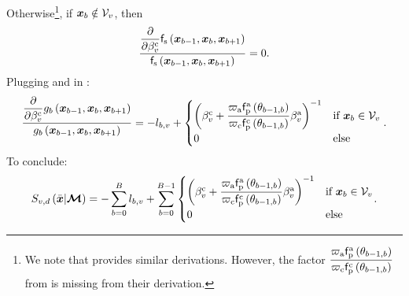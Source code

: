 \documentclass{article}
\begin{document}
Otherwise\footnote{We note that \citep{loeub2020monotonicity} provides similar derivations. However, the factor $\dfrac{\varpi_{\text{a}}\mathsf{f}_{\text{p}}^{\text{a}}\left({\theta_{b-1,b}}\right)}{\varpi_{\text{c}}\mathsf{f}_{\text{p}}^{\text{c}}\left({\theta_{b-1,b}}\right)}$ from \eq{\ref{eq:fs_deriv}} is missing from their derivation.}, if $\boldsymbol{x}_{b}\notin\mathcal{V}_{v}$, then
\begin{equation}
\label{eq:fs_deriv0}
    \frac{\dfrac{\partial}{\partial {\beta^{\text{c}}_v}}\mathsf{f}_{\text{s}}\left({\boldsymbol{x}_{b-1},\boldsymbol{x}_{b},\boldsymbol{x}_{b+1}}\right)}{\mathsf{f}_{\text{s}}\left({\boldsymbol{x}_{b-1},\boldsymbol{x}_{b},\boldsymbol{x}_{b+1}}\right)}=0.
\end{equation}
Plugging \eq{\ref{eq:trans_deriv_b}} and \eqs{\ref{eq:fs_deriv},\ref{eq:fs_deriv0}} in \eq{\ref{eq:gb_deriv}}:
\begin{equation}
\frac{\dfrac{\partial}{\partial {\beta^{\text{c}}_v}}g_{b}\left({\boldsymbol{x}_{b-1},\boldsymbol{x}_{b},\boldsymbol{x}_{b+1}}\right)}{g_{b}\left({\boldsymbol{x}_{b-1},\boldsymbol{x}_{b},\boldsymbol{x}_{b+1}}\right)} = -l_{b, v}
+
\begin{cases}
\left({\beta^{\text{c}}_{v}+\dfrac{\varpi_{\text{a}}\mathsf{f}_{\text{p}}^{\text{a}}\left({\theta_{b-1,b}}\right)}{\varpi_{\text{c}}\mathsf{f}_{\text{p}}^{\text{c}}\left({\theta_{b-1,b}}\right)}\beta^{\text{a}}_{v}}\right) ^ {-1} & \text{if $\boldsymbol{x}_{b}\in\mathcal{V}_{v}$} \\
0 & \text{else}
\end{cases}.
\end{equation}
To conclude:
\begin{equation}
S_{v, d}\left({\Bar{\boldsymbol{x}}|\boldsymbol{\mathcal{M}}}\right) = -\sum_{b=0}^{B}{l_{b,v}}+
\sum_{b=0}^{B-1}{
\begin{cases}
\left({\beta^{\text{c}}_{v}+\dfrac{\varpi_{\text{a}}\mathsf{f}_{\text{p}}^{\text{a}}\left({\theta_{b-1,b}}\right)}{\varpi_{\text{c}}\mathsf{f}_{\text{p}}^{\text{c}}\left({\theta_{b-1,b}}\right)}\beta^{\text{a}}_{v}}\right) ^ {-1} & \text{if $\boldsymbol{x}_{b}\in\mathcal{V}_{v}$} \\
0 & \text{else}
\end{cases}}.
\end{equation}
\end{document}
